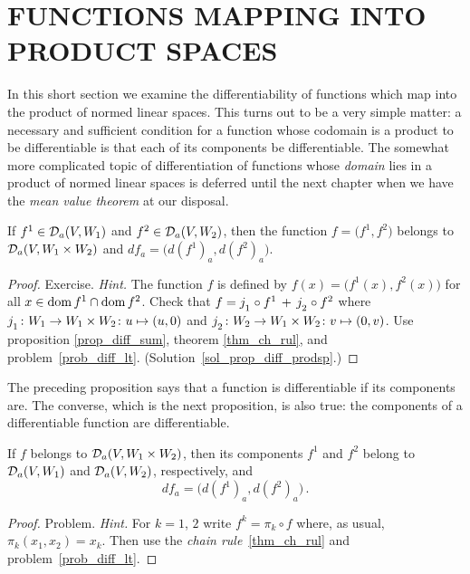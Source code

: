 \section{FUNCTIONS MAPPING INTO PRODUCT SPACES} In this short section we examine the
differentiability of functions which map into the product of normed linear spaces. This turns
out to be a very simple matter: a necessary and sufficient condition for a function whose
codomain is a product to be differentiable is that each of its components be differentiable.
The somewhat more complicated topic of differentiation of functions whose \emph{domain} lies
in a product of normed linear spaces is deferred until the next chapter when we have the
\emph{mean value theorem} at our disposal.

\begin{prop}\label{prop_diff_prodsp} If $f^1 \in \mathcal{D}_a(V,W_1)$ and $f^2 \in \mathcal{D}_a(V,W_2)$,
then the function $f = \bigl(f^1,f^2\bigr)$ belongs to $\mathcal{D}_a(V,W_1 \times W_2)$ and $df_a
= \bigl(d(f^1)_a,d(f^2)_a\bigr)$.
\end{prop}

\begin{proof}    Exercise. \emph{Hint.}  The function $f$ is defined by $f(x) =
\bigl(f^1(x),f^2(x)\bigr)$ for all $x \in \operatorname{dom} f^1 \cap \operatorname{dom} f^2$.  Check that $f =
j_{{}_{{\scriptstyle{1}}}} \circ f^1 \,+\, j_{{}_{{\scriptstyle{2}}}} \circ f^2$ where $j_{{}_{{\scriptstyle{1}}}}\colon  W_1
\rightarrow W_1 \times W_2\colon  u \mapsto (u,0)$ and $j_{{}_{{\scriptstyle{2}}}}\colon W_2 \rightarrow W_1 \times
W_2\colon  v \mapsto (0,v)$.  Use proposition \ref{prop_diff_sum}, theorem \ref{thm_ch_rul},
and problem~\ref{prob_diff_lt}.  (Solution~\ref{sol_prop_diff_prodsp}.)  \ns
\end{proof}

The preceding proposition says that a function is differentiable if its components are. The
converse, which is the next proposition, is also true: the components of a differentiable
function are differentiable.

\begin{prop}\label{prop_diff_coord}  If $f$ belongs to $\mathcal{D}_a(V, W_1 \times W_2)$, then its
components $f^1$ and $f^2$ belong to $\mathcal{D}_a(V,W_1)$ and $\mathcal{D}_a(V,W_2)$, respectively,
and
  \[ df_a = \bigl(d(f^1)_a, d(f^2)_a\bigr)\,. \]
\end{prop}

\begin{proof} Problem.  \emph{Hint.}  For $k = 1$, $2$ write $f^k = \pi_k \circ f$ where, as usual,
$\pi_k(x_1,x_2) = x_k$. Then use the \emph{chain rule}~\ref{thm_ch_rul} and
problem~\ref{prob_diff_lt}.   \ns  \end{proof}

